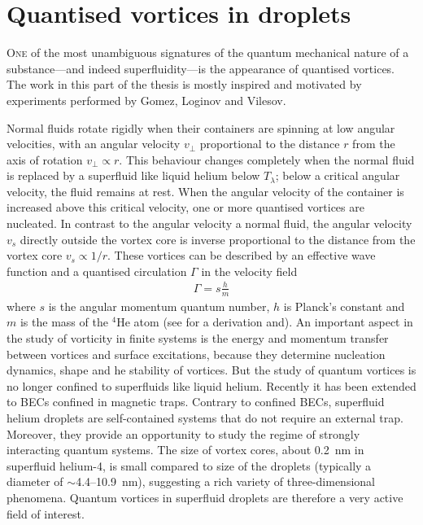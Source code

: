 \chapter{Quantised vortices in droplets}\label{sec:quant-vort}
	\lettrine[lines=4]{\color{activeColor}O}{ne} of the most unambiguous signatures of the quantum mechanical nature of a substance---and indeed superfluidity---is the appearance of quantised vortices. The work in this part of the thesis is mostly inspired and motivated by experiments performed by Gomez, Loginov and Vilesov\citep{Gomez:2012,Gom14}. 
	
	Normal fluids rotate rigidly when their containers are spinning at low angular velocities, with an angular velocity $v_\perp$ proportional to the distance $r$ from the axis of rotation $v_\perp\propto r$. This behaviour changes completely when the normal fluid is replaced by a superfluid like liquid helium below $T_\lambda$; below a critical angular velocity, the fluid remains at rest. When the angular velocity of the container is increased above this critical velocity, one or more quantised vortices are nucleated. In contrast to the angular velocity a normal fluid, the angular velocity $v_s$ directly outside the vortex core is inverse proportional to the distance from the vortex core $v_s\propto 1/r$. These vortices can be described by an effective wave function and a quantised circulation $\Gamma$ in the velocity field
	\begin{align}
		\Gamma=s\frac{h}{m}	
	\end{align}
	where $s$ is the angular momentum quantum number, $h$ is Planck’s constant and $m$ is the mass of the $^4$He atom (see  for a derivation and). An important aspect in the study of vorticity in finite systems is the energy and momentum transfer between vortices and surface excitations, because they determine nucleation dynamics, shape and he stability of vortices. But the study of quantum vortices is no longer confined to superfluids like liquid helium. Recently\citep{Pit03,Fetter2009} it has been extended to BECs confined in magnetic traps. Contrary to confined BECs, superfluid helium droplets are self-contained systems that do not require an external trap. Moreover, they provide an opportunity to study the regime of  strongly interacting quantum systems. The size of vortex cores, about 0.2~nm\citep{Don91} in superfluid helium-4, is small compared to size of the droplets (typically a diameter of $\sim$4.4--10.9~nm), suggesting a rich variety of three-dimensional phenomena. Quantum vortices in superfluid droplets are therefore a very active field of interest\citep{Clo98,Lehmann2003,Bar06,Sti06}. 
	
